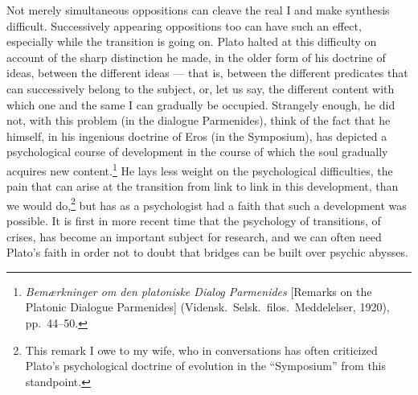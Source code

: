 \documentclass[12pt]{book}
\newcommand{\opage}[1]{\marginnote{\footnotesize\textit{[#1]}}}
\begin{document}
Not merely simultaneous oppositions can cleave the real I and make synthesis difficult. Successively
appearing oppositions too can have such an effect, especially while the transition is going on. Plato
halted at this difficulty on account of the sharp distinction he made, in the older form of his
doctrine of ideas, between the different ideas --- that is, between the different predicates that can
successively belong to the subject, or, let us say, the \opage{39}different content with which one and the same
I can gradually be occupied. Strangely enough, he did not, with this problem (in the dialogue
Parmenides), think of the fact that he himself, in his ingenious doctrine of Eros (in the Symposium),
has depicted a psychological course of development in the course of which the soul gradually acquires
new content.\footnote{\textit{Bemærkninger om den platoniske Dialog Parmenides} [Remarks on the
Platonic Dialogue Parmenides] (Vidensk.\ Selsk.\ filos.\ Meddelelser, 1920), pp.\ 44--50.} He lays
less weight on the psychological difficulties, the pain that can arise at the transition from link
to link in this development, than we would do,\footnote{This remark I owe to my wife, who in
conversations has often criticized Plato's psychological doctrine of evolution in the ``Symposium''
from this standpoint.} but has as a psychologist had a faith that such a development was possible. It
is first in more recent time that the psychology of transitions, of crises, has become an important
subject for research, and we can often need Plato's faith in order not to doubt that bridges can be
built over psychic abysses.
\end{document}

